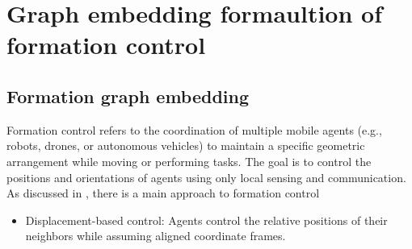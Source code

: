 \documentclass{ifacconf}
\begin{document}
\section{Graph embedding formaultion of formation control} \label{sec_formulation}

\subsection{Formation graph embedding}

Formation control refers to the coordination of multiple mobile agents (e.g., robots, drones, or autonomous vehicles) to maintain a specific geometric arrangement while moving or performing tasks. The goal is to control the positions and orientations of agents using only local sensing and communication. As discussed in \cite{oh2015survey}, there is a main approach to formation control %
\begin{itemize}
\item Displacement-based control: Agents control the relative positions of their neighbors while assuming aligned coordinate frames.
\end{itemize}

\end{document}
